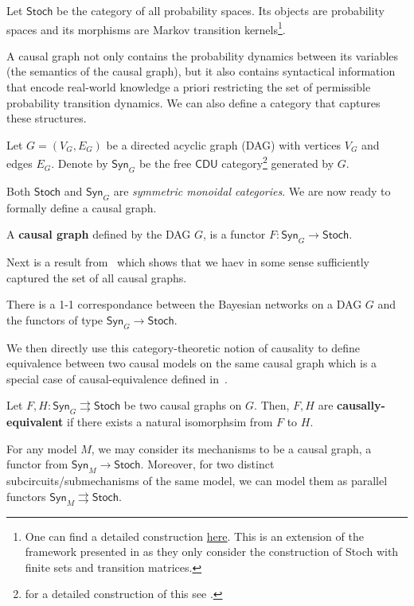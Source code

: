 \begin{defn}
Let $\textsf{Stoch}$ be the category of all probability spaces. Its objects
are probability spaces and its morphisms are Markov transition kernels\footnote{
One can find a detailed construction \href{https://arxiv.org/pdf/2111.13837}
{here}. This is an extension of the framework presented in \cite{jacobs_causal_2021}
as they only consider the construction of \textsf{Stoch} with finite sets and
transition matrices.}.
\end{defn}
A causal graph not only contains the probability dynamics between its variables
(the semantics of the causal graph), but it also contains syntactical information
that encode real-world knowledge a priori restricting the set of permissible
probability transition dynamics. We can also define a category that captures
these structures.
\begin{defn}
Let $G = (V_G, E_G)$ be a directed acyclic graph (DAG) with vertices $V_G$ and edges
$E_G$. Denote by $\textsf{Syn}_G$ be the free $\textsf{CDU}$ category\footnote{
for a detailed construction of this see \cite{jacobs_causal_2021}.
} generated
by $G$. 
\end{defn}
Both $\textsf{Stoch}$ and $\textsf{Syn}_G$ are \textit{symmetric monoidal categories}. 
We are now ready to formally define a causal graph.
\begin{defn}
A \textbf{causal graph} defined by the DAG $G$, is a functor $F: \textsf{Syn}_G \to
\textsf{Stoch}$.
\end{defn}
Next is a result from~\cite{jacobs_causal_2021} which shows that we haev in some
sense sufficiently captured the set of all causal graphs.
\begin{prop}
There is a 1-1 correspondance between the Bayesian networks on a DAG $G$ and
the functors of type $\textsf{Syn}_G \to \textsf{Stoch}$.
\end{prop}
We then directly use this category-theoretic notion of causality to define equivalence
between two causal models on the same causal graph which is a special case of
causal-equivalence defined in~\cite{otsuka_equivalence_2022}.
\begin{defn}
Let $F, H: \textsf{Syn}_G \rightrightarrows \textsf{Stoch}$ be two causal graphs
on $G$. Then, $F, H$ are \textbf{causally-equivalent} if there exists a natural
isomorphsim from $F$ to $H$. 
\end{defn}
For any model $M$, we may consider its mechanisms to be a causal graph,
a functor from $\textsf{Syn}_M \to \textsf{Stoch}$. Moreover, for two
distinct subcircuits/submechanisms of the same model, we can model them
as parallel functors $\textsf{Syn}_M \rightrightarrows \textsf{Stoch}$.

